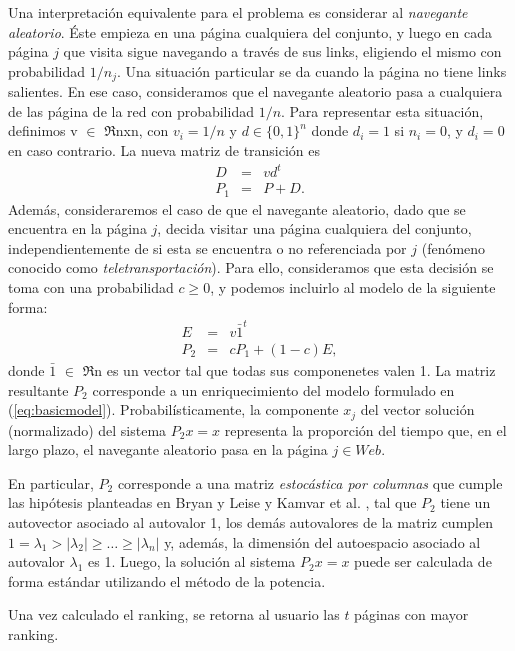 Una interpretaci\'on equivalente para el problema es considerar al \emph{navegante aleatorio}. \'Este empieza en una
p\'agina cualquiera del conjunto, y luego en cada p\'agina $j$ que visita sigue navegando a trav\'es de sus links,
eligiendo el mismo con probabilidad $1/n_j$. Una situaci\'on particular se da cuando la p\'agina no tiene links salientes. En
ese caso, consideramos que el navegante aleatorio pasa a cualquiera de las p\'agina de la red con probabilidad $1/n$.
Para representar esta situaci\'on, definimos v $\in$ $\Re$nxn, con $v_i = 1/n$ y $d \in \{0,1\}^{n}$ donde 
$d_i = 1$ si $n_i = 0$, y $d_i = 0$ en caso contrario. La nueva matriz de transici\'on es 
\begin{eqnarray*}
D & = & v d^t \\
P_1 & = & P + D.
\end{eqnarray*}
Adem\'as, consideraremos el caso de que el navegante aleatorio, dado que se encuentra en la p\'agina $j$, decida visitar
una p\'agina cualquiera del conjunto, independientemente de si esta se encuentra o no referenciada por $j$ (fen\'omeno
conocido como \emph{teletransportaci\'on}). Para ello, consideramos que esta decisi\'on se toma con una probabilidad
$c \ge 0$, y podemos incluirlo al modelo de la siguiente forma:
\begin{eqnarray*}
E & = & v \bar{1}^t \\
P_2 & = & cP_1 + (1-c)E,
\end{eqnarray*}
\noindent donde $\bar{1}$ $\in$ $\Re$n es un vector tal que todas sus componenetes valen 1. La matriz resultante
$P_2$ corresponde a un enriquecimiento del modelo formulado en (\ref{eq:basicmodel}). Probabil\'isticamente, la
componente $x_j$ del vector soluci\'on (normalizado) del sistema $P_2 x = x$ representa la proporci\'on del tiempo que,
en el largo plazo, el navegante aleatorio pasa en la p\'agina $j \in Web$.

En particular, $P_2$ corresponde a una
matriz \emph{estoc\'astica por columnas} que cumple las hip\'otesis planteadas en Bryan y Leise \cite{Bryan2006} y
Kamvar et al. \cite{Kamvar2003}, tal que $P_2$ tiene un autovector asociado al autovalor 1, los dem\'as autovalores de
la matriz cumplen $1 = \lambda_1 > |\lambda_2| \ge \dots \ge |\lambda_n|$ y, adem\'as, la dimensi\'on
del autoespacio asociado al autovalor $\lambda_1$ es 1. Luego, la soluci\'on al sistema $P_2 x = x$ puede ser calculada
de forma est\'andar utilizando el m\'etodo de la potencia.

Una vez calculado el ranking, se retorna al usuario las $t$ p\'aginas con mayor ranking.

